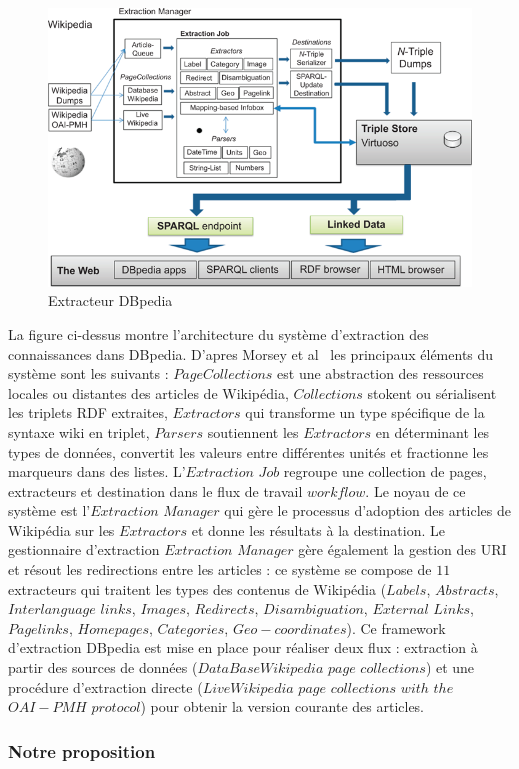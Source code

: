 \documentclass[12pt,a4	]{report}
\begin{document}
\begin{figure}[H]
\centering
\includegraphics[width=12cm]{dbpediaExtra.png}
\caption{Extracteur DBpedia}
\end{figure}
La figure ci-dessus montre l'architecture du système d'extraction des connaissances dans DBpedia.
D'apres Morsey et al~\cite{morsey2012} les principaux éléments du système sont les suivants : $PageCollections$ est une abstraction des ressources locales ou distantes des articles de Wikipédia, $Collections$ stokent ou sérialisent les triplets RDF extraites, $Extractors$ qui transforme un type spécifique de la syntaxe wiki en triplet, $Parsers$ soutiennent les $Extractors$ en déterminant les types de données, convertit les valeurs entre différentes unités et fractionne les marqueurs dans des listes. L'$Extraction$ $Job$ regroupe une collection de pages, extracteurs et destination dans le flux de travail $workflow$.
Le noyau de ce système est l'$Extraction$ $Manager$ qui gère le processus  d'adoption des articles de Wikipédia sur les $Extractors$ et donne les résultats à la destination.
Le gestionnaire d'extraction $Extraction$ $Manager$ gère également la gestion des URI et résout les redirections entre les articles : ce système se compose de $11$ extracteurs qui traitent les types des contenus de Wikipédia ($Labels$, $Abstracts$, $Interlanguage$ $links$, $Images$, $Redirects$, $Disambiguation$,
$External$ $Links$, $Pagelinks$, $Homepages$, $Categories$, $Geo-coordinates$).
Ce framework d'extraction DBpedia est mise en place pour réaliser deux flux : extraction à partir des sources de données ($DataBaseWikipedia$ $page$ $collections$) et une procédure d'extraction directe
($LiveWikipedia$ $page$ $collections$ $with$ $the$ $OAI-PMH$ $protocol$) pour obtenir la version courante des articles.
\subsubsection*{Notre proposition}
\end{document}
